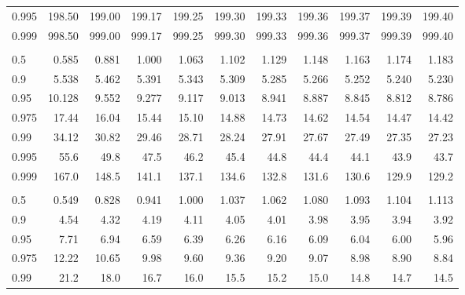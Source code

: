 \documentclass[
]{article}
\begin{document}
\begin{table}[H]
\begin{tabular}{lrrrrrrrrrr}
\hspace{1em}0.995 & 198.50 & 199.00 & 199.17 & 199.25 & 199.30 & 199.33 & 199.36 & 199.37 & 199.39 & 199.40\\
\hspace{1em}0.999 & 998.50 & 999.00 & 999.17 & 999.25 & 999.30 & 999.33 & 999.36 & 999.37 & 999.39 & 999.40\\
\addlinespace[0.3em]
\multicolumn{11}{l}{\textbf{$k_2=3$}}\\
\hspace{1em}0.5 & 0.585 & 0.881 & 1.000 & 1.063 & 1.102 & 1.129 & 1.148 & 1.163 & 1.174 & 1.183\\
\hspace{1em}0.9 & 5.538 & 5.462 & 5.391 & 5.343 & 5.309 & 5.285 & 5.266 & 5.252 & 5.240 & 5.230\\
\hspace{1em}0.95 & 10.128 & 9.552 & 9.277 & 9.117 & 9.013 & 8.941 & 8.887 & 8.845 & 8.812 & 8.786\\
\hspace{1em}0.975 & 17.44 & 16.04 & 15.44 & 15.10 & 14.88 & 14.73 & 14.62 & 14.54 & 14.47 & 14.42\\
\hspace{1em}0.99 & 34.12 & 30.82 & 29.46 & 28.71 & 28.24 & 27.91 & 27.67 & 27.49 & 27.35 & 27.23\\
\hspace{1em}0.995 & 55.6 & 49.8 & 47.5 & 46.2 & 45.4 & 44.8 & 44.4 & 44.1 & 43.9 & 43.7\\
\hspace{1em}0.999 & 167.0 & 148.5 & 141.1 & 137.1 & 134.6 & 132.8 & 131.6 & 130.6 & 129.9 & 129.2\\
\addlinespace[0.3em]
\multicolumn{11}{l}{\textbf{$k_2=4$}}\\
\hspace{1em}0.5 & 0.549 & 0.828 & 0.941 & 1.000 & 1.037 & 1.062 & 1.080 & 1.093 & 1.104 & 1.113\\
\hspace{1em}0.9 & 4.54 & 4.32 & 4.19 & 4.11 & 4.05 & 4.01 & 3.98 & 3.95 & 3.94 & 3.92\\
\hspace{1em}0.95 & 7.71 & 6.94 & 6.59 & 6.39 & 6.26 & 6.16 & 6.09 & 6.04 & 6.00 & 5.96\\
\hspace{1em}0.975 & 12.22 & 10.65 & 9.98 & 9.60 & 9.36 & 9.20 & 9.07 & 8.98 & 8.90 & 8.84\\
\hspace{1em}0.99 & 21.2 & 18.0 & 16.7 & 16.0 & 15.5 & 15.2 & 15.0 & 14.8 & 14.7 & 14.5\\

\end{tabular}
\end{table}
\end{document}
